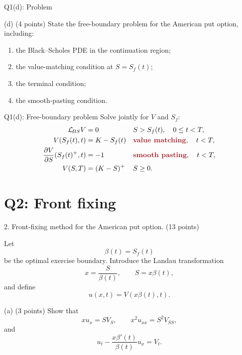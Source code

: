 \documentclass{beamer}
\newcommand{\keytext}[1]{\textcolor{lecturekey}{\textbf{#1}}}
\newcommand{\BS}{\mathcal L_{\!BS}}
\begin{document}
\begin{frame}{Q1(d): Problem}
\footnotesize
\setlength{\abovedisplayskip}{5pt}
\setlength{\belowdisplayskip}{5pt}
\begin{block}{(d) \hfill (4 points)}
State the free-boundary problem for the American put option, including:
\begin{enumerate}
\item[(i)] the Black--Scholes PDE in the continuation region;
\item[(ii)] the value-matching condition at $S=S_f(t)$;
\item[(iii)] the terminal condition;
\item[(iv)] the smooth-pasting condition.
\end{enumerate}
\end{block}
\end{frame}

\begin{frame}{Q1(d): Free-boundary problem}
\small
Solve jointly for $V$ and $S_f$:
\begin{align*}
\BS V&=0 && S>S_f(t),\quad 0\leq t<T,\\
V(S_f(t),t)&=K-S_f(t) &&\text{\keytext{value matching}},\quad t<T,\\
\frac{\partial V}{\partial S}(S_f(t)^+,t)&=-1 &&\text{\keytext{smooth pasting}},\quad t<T,\\
V(S,T)&=(K-S)^+ && S\geq0.
\end{align*}
\end{frame}

\section{Q2: Front fixing}

\begin{frame}{2. Front-fixing method for the American put option.}
\footnotesize
\setlength{\abovedisplayskip}{5pt}
\setlength{\belowdisplayskip}{5pt}
\hfill (13 points)\par
Let
\[
\beta(t)=S_f(t)
\]
be the optimal exercise boundary. Introduce the Landau transformation
\[
x=\frac{S}{\beta(t)},\qquad S=x\beta(t),
\]
and define
\[
u(x,t)=V(x\beta(t),t).
\]
\begin{block}{(a) \hfill (3 points)}
Show that
\[
xu_x=SV_S,\qquad x^2u_{xx}=S^2V_{SS},
\]
and
\[
u_t-\frac{x\beta'(t)}{\beta(t)}u_x=V_t.
\]
\end{block}
\end{frame}
\end{document}
